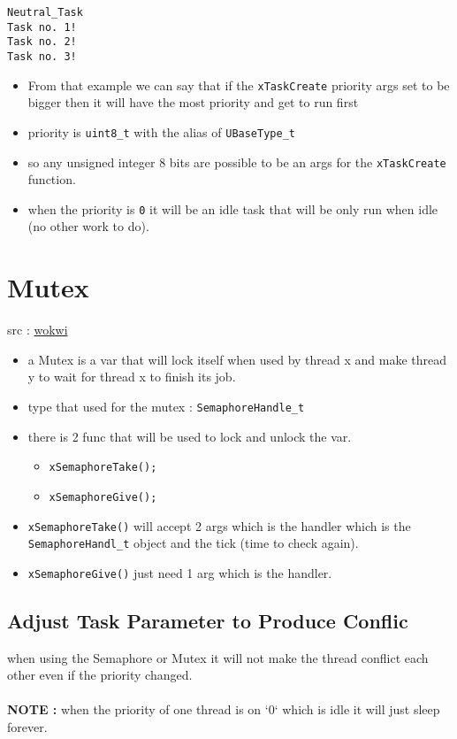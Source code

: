 \documentclass{article}
\begin{document}
\begin{lstlisting}[style=txt]
Neutral_Task
Task no. 1!
Task no. 2!
Task no. 3!
\end{lstlisting}
\begin{itemize}
    \item From that example we can say that if the \texttt{xTaskCreate} priority args set to be bigger then it will have the most priority and get to run first
    \item priority is \texttt{uint8\_t} with the alias of \texttt{UBaseType\_t}
    \item so any unsigned integer 8 bits are possible to be an args for the \texttt{xTaskCreate} function.
    \item when the priority is \texttt{0} it will be an idle task that will be only run when idle (no other work to do).
\end{itemize}

\section{Mutex}
src : \href{https://wokwi.com/projects/395466103682715649}{wokwi}
\begin{itemize}
    \item a Mutex is a var that will lock itself when used by thread x and make thread y to wait for thread x to finish its job.
    \item type that used for the mutex : \texttt{SemaphoreHandle\_t}
    \item there is 2 func that will be used to lock and unlock the var.
    \begin{itemize}[label=-]
        \item \texttt{xSemaphoreTake();}
        \item \texttt{xSemaphoreGive();}
    \end{itemize}
    \item \texttt{xSemaphoreTake()} will accept 2 args which is the handler which is the \texttt{SemaphoreHandl\_t} object and the tick (time to check again).
    \item \texttt{xSemaphoreGive()} just need 1 arg which is the handler.
\end{itemize}
\subsection{Adjust Task Parameter to Produce Conflic}
when using the Semaphore or Mutex it will not make the thread conflict each other even if the priority changed.\\
\\
\textbf{NOTE : }when the priority of one thread is on `0` which is idle it will just sleep forever.
\end{document}
